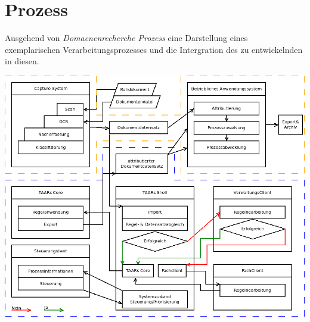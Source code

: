 \chapter{Prozess}
%
%
Ausgehend von \textit{Domaenenrecherche \> Prozess} eine Darstellung eines exemplarischen Verarbeitungsprozesses und 
die Intergration des zu entwickelnden \brand in diesen.

\includegraphics[width=\textwidth]{EISWS1516Howe_Prozess.png}
\noindent